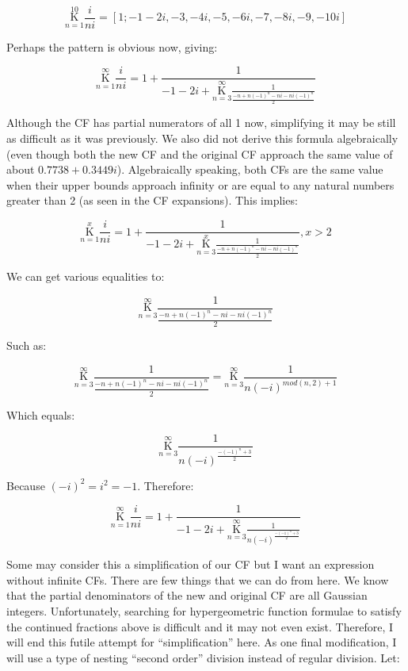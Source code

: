 \documentclass{article}
\begin{document}
$$\underset{n=1}{\overset{10}{ \mathrm K}} \frac{i}{ni}=[1;-1-2i,-3,-4i,-5,-6i,-7,-8i,-9,-10i]$$

Perhaps the pattern is obvious now, giving:

$$\underset{n=1}{\overset{\infty}{ \mathrm K}} \frac{i}{ni}=1+\frac{1}{-1-2i+\underset{n=3}{\overset{\infty}{ \mathrm K}} \frac{1}{\frac{-n+n(-1)^n-ni-ni(-1)^n}{2}}}$$

Although the CF has partial numerators of all 1 now, simplifying it may be still as difficult as it was previously. We also did not derive this formula algebraically (even though both the new CF and the original CF approach the same value of about $0.7738+0.3449i$). Algebraically speaking, both CFs are the same value when their upper bounds approach infinity or are equal to any natural numbers greater than 2 (as seen in the CF expansions). This implies:

$$\underset{n=1}{\overset{x}{ \mathrm K}} \frac{i}{ni}=1+\frac{1}{-1-2i+\underset{n=3}{\overset{x}{ \mathrm K}} \frac{1}{\frac{-n+n(-1)^n-ni-ni(-1)^n}{2}}}, x>2$$

We can get various equalities to:

$$\underset{n=3}{\overset{\infty}{ \mathrm K}} \frac{1}{\frac{-n+n(-1)^n-ni-ni(-1)^n}{2}}$$

Such as:

$$\underset{n=3}{\overset{\infty}{ \mathrm K}} \frac{1}{\frac{-n+n(-1)^n-ni-ni(-1)^n}{2}} = \underset{n=3}{\overset{\infty}{ \mathrm K}} \frac{1}{n(-i)^{mod(n,2)+1}} $$

Which equals:

$$\underset{n=3}{\overset{\infty}{ \mathrm K}} \frac{1}{n(-i)^{\frac{-(-1)^n+3}{2}}}$$

Because $(-i)^2=i^2=-1$. Therefore:

$$\underset{n=1}{\overset{\infty}{ \mathrm K}} \frac{i}{ni}=1+\frac{1}{-1-2i+\underset{n=3}{\overset{\infty}{ \mathrm K}} \frac{1}{n(-i)^{\frac{-(-1)^n+3}{2}}}}$$

Some may consider this a simplification of our CF but I want an expression without infinite CFs. There are few things that we can do from here. We know that the partial denominators of the new and original CF are all Gaussian integers. Unfortunately, searching for hypergeometric function formulae to satisfy the continued fractions above is difficult and it may not even exist. Therefore, I will end this futile attempt for “simplification” here. As one final modification, I will use a type of nesting “second order” division instead of regular division. Let:
\end{document}
